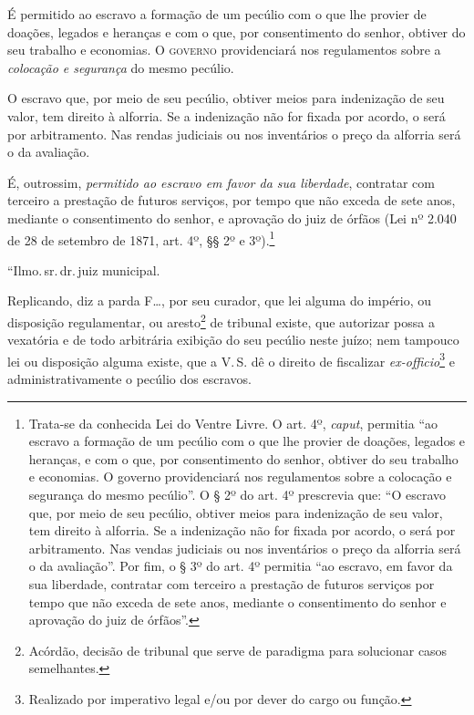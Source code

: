 É permitido ao escravo a formação de um pecúlio com o que lhe provier de
doações, legados e heranças e com o que, por consentimento do senhor,
obtiver do seu trabalho e economias. O \textsc{governo} providenciará nos
regulamentos sobre a \emph{colocação e segurança} do mesmo pecúlio.

O escravo que, por meio de seu pecúlio, obtiver meios para indenização
de seu valor, tem direito à alforria. Se a indenização não for fixada
por acordo, o será por arbitramento. Nas rendas judiciais ou nos
inventários o preço da alforria será o da avaliação.

É, outrossim, \emph{permitido ao escravo em favor da sua liberdade},
contratar com terceiro a prestação de futuros serviços, por tempo que
não exceda de sete anos, mediante o consentimento do senhor, e aprovação
do juiz de órfãos (Lei nº 2.040 de 28 de setembro de 1871, art. 4º, §§
2º e 3º).\footnote{ Trata-se da conhecida Lei do Ventre Livre. O art.
  4º, \emph{caput}, permitia ``ao escravo a formação de um pecúlio com o
  que lhe provier de doações, legados e heranças, e com o que, por
  consentimento do senhor, obtiver do seu trabalho e economias. O
  governo providenciará nos regulamentos sobre a colocação e segurança
  do mesmo pecúlio''. O § 2º do art. 4º prescrevia que: ``O escravo que,
  por meio de seu pecúlio, obtiver meios para indenização de seu valor,
  tem direito à alforria. Se a indenização não for fixada por acordo, o
  será por arbitramento. Nas vendas judiciais ou nos inventários o preço
  da alforria será o da avaliação''. Por fim, o § 3º do art. 4º permitia
  ``ao escravo, em favor da sua liberdade, contratar com terceiro a
  prestação de futuros serviços por tempo que não exceda de sete anos,
  mediante o consentimento do senhor e aprovação do juiz de órfãos''.}

\asterisc

``Ilmo.\,sr.\,dr.\,juiz municipal.

Replicando, diz a parda F\ldots{}, por seu curador, que lei alguma do
império, ou disposição regulamentar, ou aresto\footnote{ Acórdão,
  decisão de tribunal que serve de paradigma para solucionar casos
  semelhantes.} de tribunal existe, que autorizar possa a vexatória e de
todo arbitrária exibição do seu pecúlio neste juízo; nem tampouco lei ou
disposição alguma existe, que a V.\,S. dê o direito de fiscalizar
\emph{ex-officio}\footnote{ Realizado por imperativo legal e/ou por
  dever do cargo ou função.} e administrativamente o pecúlio dos
escravos.

